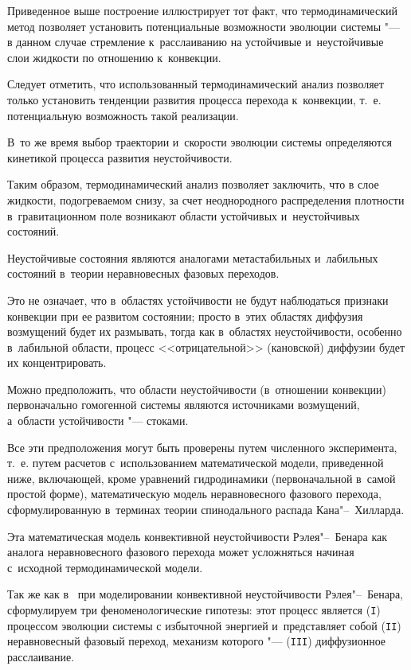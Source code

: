 \indent

Приведенное выше построение иллюстрирует тот факт, что термодинамический метод позволяет установить потенциальные возможности эволюции системы "--- в данном случае стремление к~расслаиванию на устойчивые и~неус\-тойчивые слои жидкости по отношению к~конвекции.

Следует отметить, что использованный термодинамический анализ позволяет только установить тенденции развития процесса перехода к~конвекции, т.~е. потенциальную возможность такой реализации. 

В~то же время выбор траектории и~скорости эволюции системы определяются кинетикой процесса развития неустой\-чивости.



Таким образом, термодинамический анализ позволяет заключить, что \linebreak в слое жидкости, подогреваемом снизу, за счет неоднородного распределения плотности в~гравитационном поле возникают области устойчивых и~неустойчивых состояний.

Неустойчивые состояния являются аналогами метастабильных и~лабильных состояний в~теории неравновесных фазовых  переходов. 

Это не означает, что в~областях устойчивости не будут наблюдаться признаки конвекции при ее развитом состоянии; просто в~этих областях диффузия возмущений будет их размывать, тогда как в~областях неустойчивости, особенно в~лабильной области, процесс <<отрицательной>> (кановской) диффузии будет их концентрировать. 

Можно предположить, что области неустойчивости (в~отношении конвекции) первоначально гомогенной системы являются источниками возмущений, а~области устойчивости "--- стоками.



Все эти предположения могут быть проверены путем численного эксперимента, т.~е. путем расчетов с~использованием математической модели, приведенной ниже, включающей, кроме уравнений гидродинамики (первоначальной в~самой простой форме), математическую модель неравновесного фазового перехода, сформулированную в~терминах теории спинодального распада Кана"--~Хилларда. 

Эта математическая модель конвективной неустойчивости Рэлея"--~Бенара как аналога неравновесного фазового перехода может усложняться начиная с~исходной термодинамической модели.

Так же как в~\cite{lukashev:bib50} при моделировании конвективной неустойчивости Рэлея"--~Бенара, сформулируем три феноменологические гипотезы: этот процесс является ({\tt I}) процессом эволюции системы с избыточной энергией  и~представляет собой ({\tt I\!I}) неравновесный фазовый переход, механизм которого "--- ({\tt I\!I\!I}) диффузионное расслаивание. 

